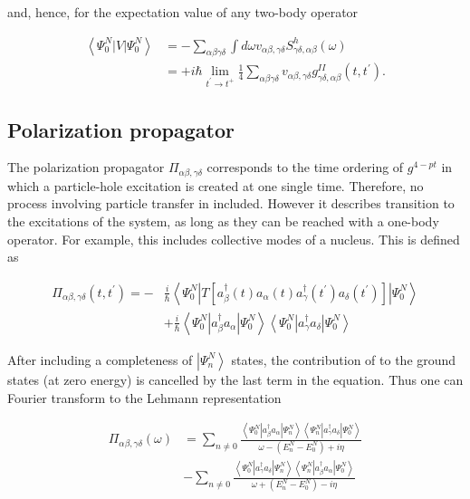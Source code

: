 {and, hence, for the expectation value of any two-body operator

$$
\begin{aligned}
\left\langle\Psi_{0}^{N}|V| \Psi_{0}^{N}\right\rangle & =-\sum_{\alpha \beta \gamma \delta} \int d \omega v_{\alpha \beta, \gamma \delta} S_{\gamma \delta, \alpha \beta}^{h}(\omega) \\
& =+i \hbar \lim _{t^{\prime} \rightarrow t^{+}} \frac{1}{4} \sum_{\alpha \beta \gamma \delta} v_{\alpha \beta, \gamma \delta} g_{\gamma \delta, \alpha \beta}^{I I}\left(t, t^{\prime}\right) .
\end{aligned}
$$

\subsection{Polarization propagator}

The polarization propagator $\Pi_{\alpha \beta, \gamma \delta}$
corresponds to the time ordering of $g^{4-p t}$ in which a
particle-hole excitation is created at one single time. Therefore, no
process involving particle transfer in included. However it describes
transition to the excitations of the system, as long as they can be
reached with a one-body operator. For example, this includes
collective modes of a nucleus. This is defined as

$$
\begin{aligned}
\Pi_{\alpha \beta, \gamma \delta}\left(t, t^{\prime}\right)=- & \frac{i}{\hbar}\left\langle\Psi_{0}^{N}\left|T\left[a_{\beta}^{\dagger}(t) a_{\alpha}(t) a_{\gamma}^{\dagger}\left(t^{\prime}\right) a_{\delta}\left(t^{\prime}\right)\right]\right| \Psi_{0}^{N}\right\rangle \\
& +\frac{i}{\hbar}\left\langle\Psi_{0}^{N}\left|a_{\beta}^{\dagger} a_{\alpha}\right| \Psi_{0}^{N}\right\rangle\left\langle\Psi_{0}^{N}\left|a_{\gamma}^{\dagger} a_{\delta}\right| \Psi_{0}^{N}\right\rangle
\end{aligned}
$$


  After including a completeness of $\left|\Psi_{n}^{N}\right\rangle$
states, the contribution of to the ground states (at zero
energy) is cancelled by the last term in the equation. Thus one can
Fourier transform to the Lehmann representation

$$
\begin{aligned}
\Pi_{\alpha \beta, \gamma \delta}(\omega) & =\sum_{n \neq 0} \frac{\left\langle\Psi_{0}^{N}\left|a_{\beta}^{\dagger} a_{\alpha}\right| \Psi_{n}^{N}\right\rangle\left\langle\Psi_{n}^{N}\left|a_{\gamma}^{\dagger} a_{\delta}\right| \Psi_{0}^{N}\right\rangle}{\omega-\left(E_{n}^{N}-E_{0}^{N}\right)+i \eta} \\
& -\sum_{n \neq 0} \frac{\left\langle\Psi_{0}^{N}\left|a_{\gamma}^{\dagger} a_{\delta}\right| \Psi_{n}^{N}\right\rangle\left\langle\Psi_{n}^{N}\left|a_{\beta}^{\dagger} a_{\alpha}\right| \Psi_{0}^{N}\right\rangle}{\omega+\left(E_{n}^{N}-E_{0}^{N}\right)-i \eta}
\end{aligned}
$$


}
